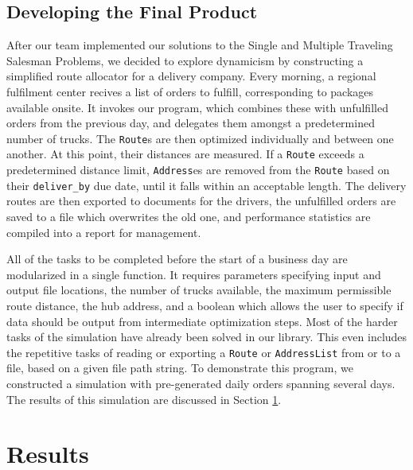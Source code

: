\documentclass[letterpaper]{article}
\begin{document}
    \subsection{Developing the Final Product}
    \label{subsection:Developing_the_Final_Product}
    After our team implemented our solutions to the Single and Multiple Traveling Salesman Problems, we decided to explore dynamicism by constructing a simplified route allocator for a delivery company. Every morning, a regional fulfilment center recives a list of orders to fulfill, corresponding to packages available onsite. It invokes our program, which combines these with unfulfilled orders from the previous day, and delegates them amongst a predetermined number of trucks. The \verb|Route|s are then optimized individually and between one another. At this point, their distances are measured. If a \verb|Route| exceeds a predetermined distance limit, \verb|Address|es are removed from the \verb|Route| based on their \verb|deliver_by| due date, until it falls within an acceptable length. The delivery routes are then exported to documents for the drivers, the unfulfilled orders are saved to a file which overwrites the old one, and performance statistics are compiled into a report for management.

    All of the tasks to be completed before the start of a business day are modularized in a single function. It requires parameters specifying input and output file locations, the number of trucks available, the maximum permissible route distance, the hub address, and a boolean which allows the user to specify if data should be output from intermediate optimization steps. Most of the harder tasks of the simulation have already been solved in our library. This even includes the repetitive tasks of reading or exporting a \verb|Route| or \verb|AddressList| from or to a file, based on a given file path string. To demonstrate this program, we constructed a simulation with pre-generated daily orders spanning several days. The results of this simulation are discussed in Section \ref{section:Results}.

    \section{Results}
    \label{section:Results}
\end{document}
